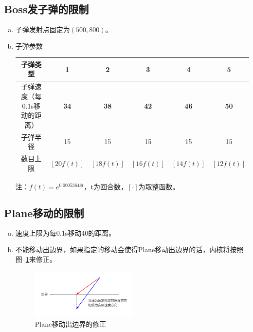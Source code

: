 \documentclass[11pt,a4paper]{article}
\begin{document}
\subsection{Boss发子弹的限制}
\begin{enumerate}[(a)]
\item 子弹发射点固定为$(500,800)$。
\item 子弹参数
\begin{center}
\begin{tabular}{|c|c|c|c|c|c|}
\hline
子弹类型&1&2&3&4&5\\
\hline
子弹速度（每0.1s移动的距离）&\textbf{34}&\textbf{38}&\textbf{42}&\textbf{46}&\textbf{50}\\
\hline
子弹半径&15&15&15&15&15\\
\hline
数目上限&$[20f(t)]$&$[18f(t)]$&$[16f(t)]$&$[14f(t)]$&$[12f(t)]$\\
\hline
\end{tabular}
\end{center}

注：$f(t)=e^{0.00053648t}$，t为回合数，$[\cdot]$为取整函数。
\end{enumerate}
\subsection{Plane移动的限制}
\begin{enumerate}[(a)]
\item 速度上限为每0.1s移动40的距离。
\item 不能移动出边界，如果指定的移动会使得Plane移动出边界的话，内核将按照图~\ref{fig:side}来修正。
\begin{figure}[h!]
\centering
\includegraphics[width=0.5\textwidth]{side.png}
\caption{Plane移动出边界的修正}
\label{fig:side}
\end{figure}
\end{enumerate}
\end{document}
